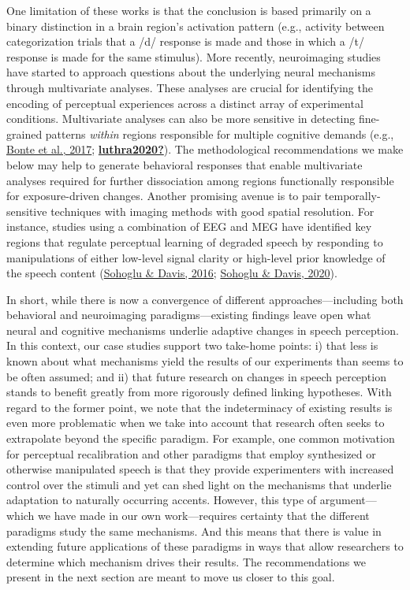 \documentclass[
  11pt,
  english,
  man,floatsintext]{apa6}
\begin{document}
One limitation of these works is that the conclusion is based primarily on a binary distinction in a brain region's activation pattern (e.g., activity between categorization trials that a /d/ response is made and those in which a /t/ response is made for the same stimulus). More recently, neuroimaging studies have started to approach questions about the underlying neural mechanisms through multivariate analyses. These analyses are crucial for identifying the encoding of perceptual experiences across a distinct array of experimental conditions. Multivariate analyses can also be more sensitive in detecting fine-grained patterns \emph{within} regions responsible for multiple cognitive demands (e.g., \protect\hyperlink{ref-bonte2017}{Bonte et al., 2017}; \protect\hyperlink{ref-luthra2020}{\textbf{luthra2020?}}). The methodological recommendations we make below may help to generate behavioral responses that enable multivariate analyses required for further dissociation among regions functionally responsible for exposure-driven changes. Another promising avenue is to pair temporally-sensitive techniques with imaging methods with good spatial resolution. For instance, studies using a combination of EEG and MEG have identified key regions that regulate perceptual learning of degraded speech by responding to manipulations of either low-level signal clarity or high-level prior knowledge of the speech content (\protect\hyperlink{ref-sohoglu-davis2016}{Sohoglu \& Davis, 2016}; \protect\hyperlink{ref-sohoglu-davis2020}{Sohoglu \& Davis, 2020}).

In short, while there is now a convergence of different approaches---including both behavioral and neuroimaging paradigms---existing findings leave open what neural and cognitive mechanisms underlie adaptive changes in speech perception. In this context, our case studies support two take-home points: i) that less is known about what mechanisms yield the results of our experiments than seems to be often assumed; and ii) that future research on changes in speech perception stands to benefit greatly from more rigorously defined linking hypotheses. With regard to the former point, we note that the indeterminacy of existing results is even more problematic when we take into account that research often seeks to extrapolate beyond the specific paradigm. For example, one common motivation for perceptual recalibration and other paradigms that employ synthesized or otherwise manipulated speech is that they provide experimenters with increased control over the stimuli and yet can shed light on the mechanisms that underlie adaptation to naturally occurring accents. However, this type of argument---which we have made in our own work---requires certainty that the different paradigms study the same mechanisms. And this means that there is value in extending future applications of these paradigms in ways that allow researchers to determine which mechanism drives their results. The recommendations we present in the next section are meant to move us closer to this goal.
\end{document}
